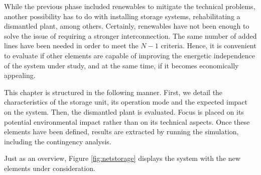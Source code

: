 While the previous phase included renewables to mitigate the technical problems, another possibility has to do with installing storage systems, rehabilitating a dismantled plant, among others. Certainly, renewables have not been enough to solve the issue of requiring a stronger interconnection. The same number of added lines have been needed in order to meet the $N-1$ criteria. Hence, it is convenient to evaluate if other elements are capable of improving the energetic independence of the system under study, and at the same time, if it becomes economically appealing.

This chapter is structured in the following manner. First, we detail the characteristics of the storage unit, its operation mode and the expected impact on the system. Then, the dismantled plant is evaluated. Focus is placed on its potential environmental impact rather than on its technical aspects. Once these elements have been defined, results are extracted by running the simulation, including the contingency analysis.

Just as an overview, Figure \ref{fig:netstorage} displays the system with the new elements under consideration.


